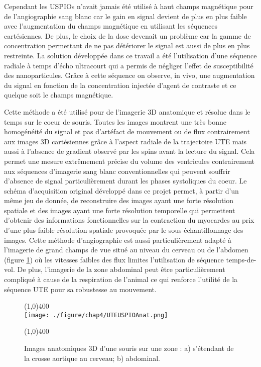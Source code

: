 Cependant les USPIOs n'avait jamais été utilisé à haut champs magnétique pour de l'angiographie sang blanc car le gain en signal devient de plus en plus faible avec l'augmentation du champs magnétique en utilisant les séquences cartésiennes. De plus, le choix de la dose devenait un problème car la gamme de concentration permettant de ne pas détériorer le signal est aussi de plus en plus restreinte. La solution développée dans ce travail a été l'utilisation d'une séquence radiale à temps d'écho ultracourt qui a permis de négliger l'effet de susceptibilité des nanoparticules. Grâce à cette séquence on observe, in vivo, une augmentation du signal en fonction de la concentration injectée d'agent de contraste et ce quelque soit le champs magnétique.

Cette méthode a été utilisé pour de l'imagerie 3D anatomique et résolue dans le temps sur le coeur de souris. Toutes les images montrent une très bonne homogénéité du signal et pas d'artéfact de mouvement ou de flux contrairement aux images 3D cartésiennes grâce à l'aspect radiale de la trajectoire UTE mais aussi à l'absence de gradient observé par les spins avant la lecture du signal. Cela permet une mesure extrêmement précise du volume des ventricules contrairement aux séquences d'imagerie sang blanc conventionnelles qui peuvent souffrir d'absence de signal particulièrement durant les phases systoliques du coeur. Le schéma d'acquisition original développé dans ce projet permet, à partir d'un même jeu de donnée, de reconstruire des images ayant une forte résolution spatiale et des images ayant une forte résolution temporelle qui permettent d'obtenir des informations fonctionnelles sur la contraction du myocardes au prix d'une plus faible résolution spatiale provoquée par le sous-échantillonnage des images. Cette méthode d'angiographie est aussi particulièrement adapté à l'imagerie de grand champs de vue situé au niveau du cerveau ou de l'abdomen (figure \ref{fig:UTEUSPIOAnat}) où les vitesses faibles des flux limites l'utilisation de séquence temps-de-vol. De plus, l'imagerie de la zone abdominal peut être particulièrement compliqué à cause de la respiration de l'animal ce qui renforce l'utilité de la séquence UTE pour sa robustesse au mouvement. 

\begin{figure}[H]
\centering
\line(1,0){400} \\
\texttt{[image: ./figure/chap4/UTEUSPIOAnat.png]}
\caption[Imagerie anatomique UTE + USPIO]{\label{fig:UTEUSPIOAnat} Images anatomiques 3D d'une souris sur une zone : a) s'étendant de la crosse aortique au cerveau; b) abdominal.}
\line(1,0){400} \\ 
\end{figure}

